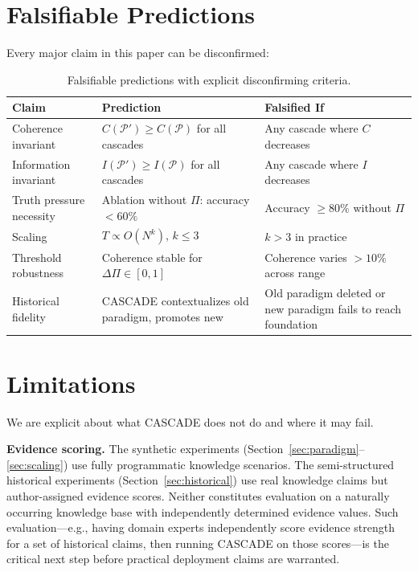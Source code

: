 \documentclass[11pt,a4paper]{article}
\theoremstyle{definition}
\newcommand{\tp}{\Pi}
\begin{document}
\section{Falsifiable Predictions}\label{sec:falsifiable}

Every major claim in this paper can be disconfirmed:

\begin{table}[H]
\centering
\caption{Falsifiable predictions with explicit disconfirming criteria.}
\label{tab:falsifiable}
\begin{tabular}{@{}p{4cm}p{4cm}p{4.5cm}@{}}
\toprule
\textbf{Claim} & \textbf{Prediction} & \textbf{Falsified If} \\
\midrule
Coherence invariant     & $C(\mathcal{P}') \geq C(\mathcal{P})$ for all cascades
                        & Any cascade where $C$ decreases \\
Information invariant   & $I(\mathcal{P}') \geq I(\mathcal{P})$ for all cascades
                        & Any cascade where $I$ decreases \\
Truth pressure necessity & Ablation without $\tp$: accuracy $< 60\%$
                        & Accuracy $\geq 80\%$ without $\tp$ \\
Scaling                 & $T \propto O(N^k)$, $k \leq 3$
                        & $k > 3$ in practice \\
Threshold robustness    & Coherence stable for $\Delta\tp \in [0, 1]$
                        & Coherence varies $> 10\%$ across range \\
Historical fidelity     & CASCADE contextualizes old paradigm, promotes new
                        & Old paradigm deleted or new paradigm fails to reach foundation \\
\bottomrule
\end{tabular}
\end{table}

\section{Limitations}\label{sec:limitations}

We are explicit about what CASCADE does not do and where it may fail.

\textbf{Evidence scoring.} The synthetic experiments
(Section~\ref{sec:paradigm}--\ref{sec:scaling}) use fully programmatic knowledge
scenarios. The semi-structured historical experiments (Section~\ref{sec:historical})
use real knowledge claims but author-assigned evidence scores. Neither constitutes
evaluation on a naturally occurring knowledge base with independently determined
evidence values. Such evaluation---e.g., having domain experts independently score
evidence strength for a set of historical claims, then running CASCADE on those
scores---is the critical next step before practical deployment claims are warranted.
\end{document}
